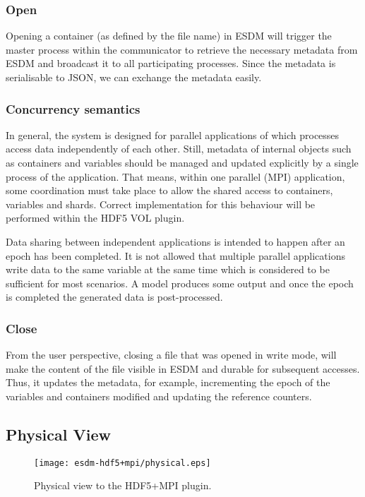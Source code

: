\subsubsection{Open}

Opening a container (as defined by the file name) in ESDM will trigger the master process within the communicator to retrieve the necessary metadata from ESDM and broadcast it to all participating processes.
Since the metadata is serialisable to JSON, we can exchange the metadata easily.

\subsubsection{Concurrency semantics}

In general, the system is designed for parallel applications of which processes access data independently of each other.
Still, metadata of internal objects such as containers and variables should be managed and updated explicitly by a single process of the application.
That means, within one parallel (MPI) application, some coordination must take place to allow the shared access to containers, variables and shards.
Correct implementation for this behaviour will be performed within the HDF5 VOL plugin.

Data sharing between independent applications is intended to happen after an epoch has been completed.
It is not allowed that multiple parallel applications write data to the same variable at the same time which is considered to be sufficient for most scenarios. A model produces some output and once the epoch is completed the generated data is post-processed.

\subsubsection{Close}

From the user perspective, closing a file that was opened in write mode, will make the content of the file visible in ESDM and durable for subsequent accesses.
Thus, it updates the metadata, for example, incrementing the epoch of the variables and containers modified and updating the reference counters.

\subsection{Physical View}


\begin{figure}
	\centering
	\texttt{[image: esdm-hdf5+mpi/physical.eps]}
	\caption{Physical view to the HDF5+MPI plugin.}
	\label{fig:esdm hdf5 physical view}
\end{figure}

